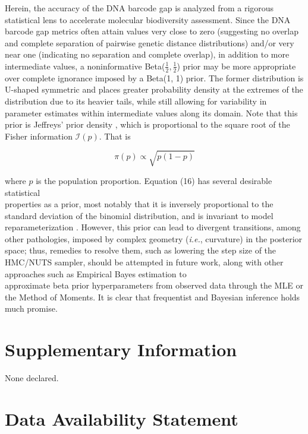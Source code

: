 \documentclass[12pt]{article}
\begin{document}
Herein, the accuracy of the DNA barcode gap is analyzed from a rigorous statistical lens to accelerate molecular biodiversity assessment. Since the DNA barcode gap metrics often attain values very close to zero (suggesting no overlap and complete separation of pairwise genetic distance distributions) and/or very near one (indicating no separation and complete overlap), in addition to more intermediate values, a noninformative Beta($\frac{1}{2}, \frac{1}{2}$) prior may be more appropriate over complete ignorance imposed by a Beta(1, 1) prior. The former distribution is U-shaped symmetric and places greater probability density at the extremes of the distribution due to its heavier tails, while still allowing for variability in parameter estimates within intermediate values along its domain. Note that this prior is Jeffreys' prior density \citep{jeffreys1946invariant}, which is  proportional to the square root of the Fisher information $\mathcal{I}(p)$. That is

\begin{equation}
\pi(p) \propto \sqrt{p(1-p)}
\end{equation}

\noindent where $p$ is the population proportion. Equation (16) has several desirable statistical \\ properties as a prior, most notably that it is inversely proportional to the standard deviation of the binomial distribution, and is invariant to model reparameterization \citep{gelman2014bayesian}. However, this prior can lead to divergent transitions, among other pathologies, imposed by complex geometry (\textit{i.e.}, curvature) in the posterior space; thus, remedies to resolve them, such as lowering the step size of the HMC/NUTS sampler, should be attempted in future work, along with other approaches such as Empirical Bayes estimation to \\ approximate beta prior hyperparameters from observed data through the MLE or the Method of Moments. It is clear that frequentist and Bayesian inference holds much promise.


\newpage

\section*{Supplementary Information}

None declared.

\section*{Data Availability Statement}
\end{document}
